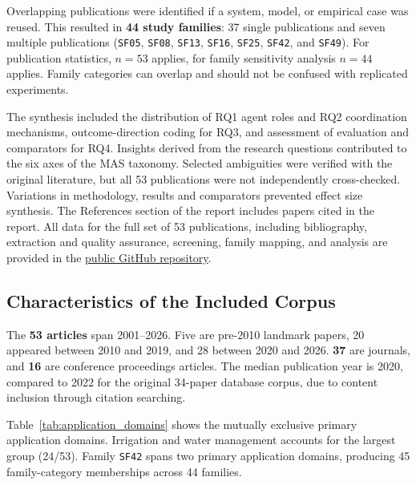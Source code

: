\documentclass[11pt,a4paper]{article}
\begin{document}
Overlapping publications were identified if a system, model, or empirical case was reused. This resulted in \textbf{44 study families}: 37 single publications and seven multiple publications
(\texttt{SF05}, \texttt{SF08}, \texttt{SF13}, \texttt{SF16},
\texttt{SF25}, \texttt{SF42}, and \texttt{SF49}). For publication
statistics, $n=53$ applies, for family sensitivity analysis $n=44$
applies. Family categories can overlap and should not be confused with
replicated experiments.

The synthesis included the distribution of RQ1 agent roles and RQ2 coordination mechanisms, outcome-direction coding for RQ3, and assessment of evaluation and comparators for RQ4. Insights derived from the research questions contributed to the six axes of the MAS taxonomy. Selected ambiguities were verified with the original literature, but all 53 publications were not independently cross-checked. Variations in methodology, results and comparators prevented effect size synthesis. The References section of the report includes papers cited in the report. All data for the full set of 53 publications, including bibliography, extraction and quality assurance, screening, family mapping, and analysis are provided in the \href{https://github.com/ChayanTalukder/Multi-Agent-Systems-for-Sustainable-Smart-Farming} {public GitHub repository}.

\subsection{Characteristics of the Included Corpus}

The \textbf{53 articles} span 2001--2026. Five are pre-2010 landmark papers, 20 appeared between 2010 and 2019, and 28 between 2020 and 2026. \textbf{37} are journals, and \textbf{16} are conference proceedings articles. The median publication year is 2020, compared to 2022 for the original 34-paper database corpus, due to content inclusion through citation searching.

Table~\ref{tab:application_domains} shows the mutually exclusive primary application domains. Irrigation and water management accounts for the largest group (24/53). Family \texttt{SF42} spans two primary application domains, producing 45 family-category memberships across 44 families.
\end{document}
